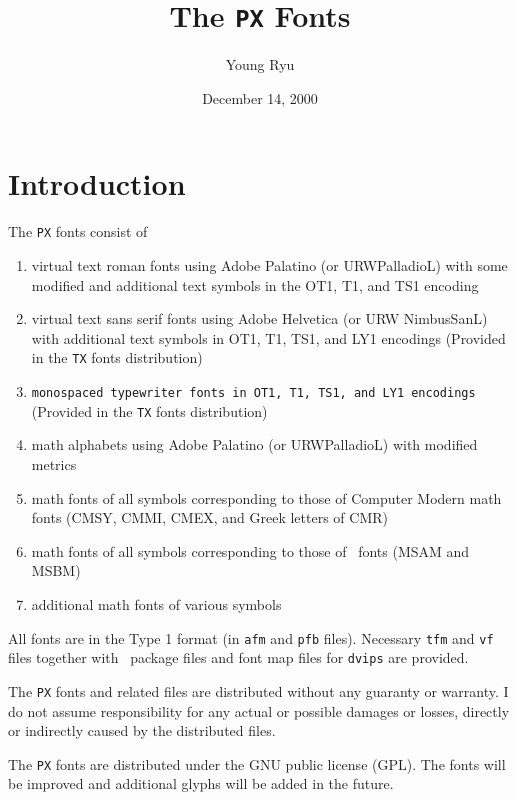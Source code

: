 \documentclass[10pt]{article}
\begin{document}
\title{The \texttt{PX} Fonts}

\author{Young Ryu}

\date{December 14, 2000}

\maketitle

\tableofcontents

\clearpage
\section{Introduction}

The \texttt{PX} fonts consist of
\begin{enumerate}\itemsep=0pt
\item virtual text roman fonts using Adobe Palatino (or URWPalladioL) with
      some modified and additional text symbols in the OT1, T1, and TS1 encoding
\item \textsf{virtual text sans serif fonts using Adobe Helvetica (or URW NimbusSanL) with
      additional text symbols in OT1, T1, TS1, and LY1 encodings}
      (Provided in the \texttt{TX} fonts distribution)
\item \texttt{monospaced typewriter fonts in OT1, T1, TS1, and LY1 encodings}
      (Provided in the \texttt{TX} fonts distribution)
\item math alphabets using Adobe Palatino (or URWPalladioL)
      with modified metrics
\item math fonts of all symbols corresponding to those of Computer Modern
      math fonts (CMSY, CMMI, CMEX, and Greek letters of CMR)
\item math fonts of all symbols corresponding to those of \AmS\ fonts
      (MSAM and MSBM)
\item additional math fonts of various symbols
\end{enumerate}
%
All fonts are in the Type 1 format (in \texttt{afm} and \texttt{pfb} files).
Necessary \texttt{tfm} and \texttt{vf} files together with
\LaTeXe\ package files and font map files for \texttt{dvips} are
provided.

\begin{bfseries}%
The \texttt{PX} fonts and related files are distributed 
without any guaranty or warranty.
I do not assume responsibility for any actual or possible
damages or losses, directly or indirectly caused by the
distributed files.
\end{bfseries}
The \texttt{PX} fonts are distributed under the GNU public license (GPL)\@.
The fonts will be improved and additional glyphs will be added
in the future.
\end{document}
